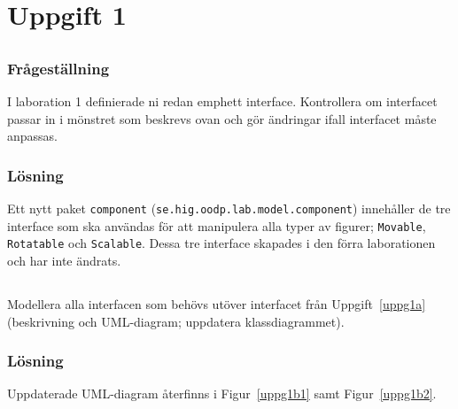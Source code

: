 %
%

\section{Uppgift 1}\label{sec:uppg1}

\subsection{}\label{sec:uppg1a}
\subsubsection*{Frågeställning}
\item I laboration 1 definierade ni redan emph{ett} interface. Kontrollera om
interfacet passar in i mönstret som beskrevs ovan och gör ändringar ifall
interfacet måste anpassas.

\subsubsection*{Lösning}
Ett nytt paket \texttt{component} (\texttt{se.hig.oodp.lab.model.component})
innehåller de tre interface som ska användas för att manipulera alla typer av
figurer; \texttt{Movable}, \texttt{Rotatable} och \texttt{Scalable}.
Dessa tre interface skapades i den förra laborationen och har inte ändrats.


\subsection{}\label{sec:uppg1b}
\subsubsection*{}
Modellera alla interfacen som behövs utöver interfacet från
Uppgift~\ref{uppg1a} (beskrivning och UML-diagram; uppdatera klassdiagrammet).

\subsubsection*{Lösning}
Uppdaterade UML-diagram återfinns i Figur~\ref{uppg1b1} samt
Figur~\ref{uppg1b2}.

